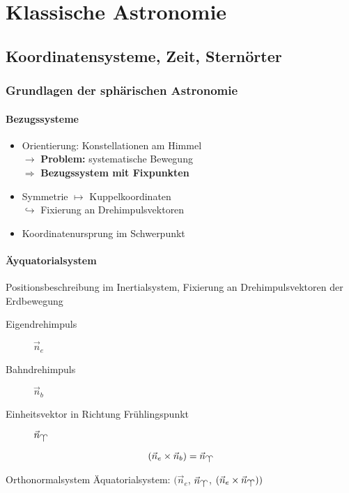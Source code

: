 \part{Klassische Astronomie}
\chapter{Koordinatensysteme, Zeit, Sternörter}
\section{Grundlagen der sphärischen Astronomie}
\subsection{Bezugssysteme}
\begin{itemize}
    \item Orientierung: Konstellationen am Himmel\\
        $\rightarrow$ \textbf{Problem:} systematische Bewegung\\
        $\Rightarrow$ \textbf{Bezugssystem mit Fixpunkten}
    \item Symmetrie $\mapsto$ Kuppelkoordinaten \\
        $\hookrightarrow$ Fixierung an Drehimpulsvektoren
    \item Koordinatenursprung im Schwerpunkt
\end{itemize}

\subsection{Äyquatorialsystem}
\begin{goal}
    Positionsbeschreibung im Inertialsystem, Fixierung an Drehimpulsvektoren
    der Erdbewegung
\end{goal}

\begin{description}
    \item[Eigendrehimpuls]  $\vec n_e$
    \item[Bahndrehimpuls]   $\vec n_b$
    \item[Einheitsvektor in Richtung Frühlingspunkt]   $\vec n_{\vernal}$
\end{description}

\begin{equation}
    (\vec n_e \times \vec n_b) = \vec n_{\vernal}
\end{equation}

\begin{definition}
    Orthonormalsystem Äquatorialsystem: $(\vec n_e$, $\vec n_{\vernal}$, $(\vec n_e \times \vec n_{\vernal}))$
\end{definition}

